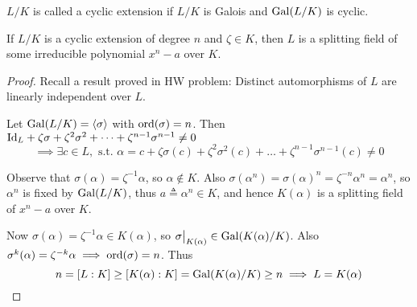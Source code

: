 \begin{definition}
  $L/K$ is called a cyclic extension if $L/K$ is Galois and $\operatorname{Gal}(L/K)$ is cyclic.
\end{definition}

\begin{theorem} \label{thm:kummer-base-theorem}
  If $L/K$ is a cyclic extension of degree $n$ and $\zeta \in K$, then $L$ is a splitting field of
  some irreducible polynomial $x^n - a$ over $K$.

  \begin{proof}
    Recall a result proved in HW problem: Distinct automorphisms of $L$ are linearly independent over $L$.
    
    Let $\operatorname{Gal}(L/K) = \langle\sigma\rangle$ with $\operatorname{ord}(\sigma) = n$. Then
    ${\rm Id}_L + \zeta \sigma + \zeta^2 \sigma^2 + \dots + \zeta^{n-1} \sigma^{n-1} \neq 0$
    \[ \implies \exists c \in L, \text{ s.t. } \alpha = c + \zeta \sigma(c) + \zeta^2 \sigma^2(c)
    + \dots + \zeta^{n-1} \sigma^{n-1}(c) \neq 0 \]

    Observe that $\sigma(\alpha) = \zeta^{-1} \alpha$, so $\alpha \not\in K$. Also $\sigma(\alpha^n)
    = \sigma(\alpha)^n = \zeta^{-n}\alpha^n = \alpha^n$, so $\alpha^n$ is fixed by
    $\operatorname{Gal}(L/K)$, thus $a \triangleq \alpha^n \in K$, and hence $K(\alpha)$
    is a splitting field of $x^n - a$ over $K$.

    Now $\sigma(\alpha) = \zeta^{-1}\alpha \in K(\alpha)$, so $\sigma\big|_{K(\alpha)} \in \operatorname{Gal}(K(\alpha) / K)$.
    Also $\sigma^k(\alpha) = \zeta^{-k} \alpha \implies \operatorname{ord}(\sigma) = n$.
    Thus
    \[
      n = [L: K] \geq [K(\alpha): K] = \operatorname{Gal}(K(\alpha) / K) \geq n \implies L = K(\alpha)
      \qedhere
    \]
  \end{proof}
\end{theorem}

